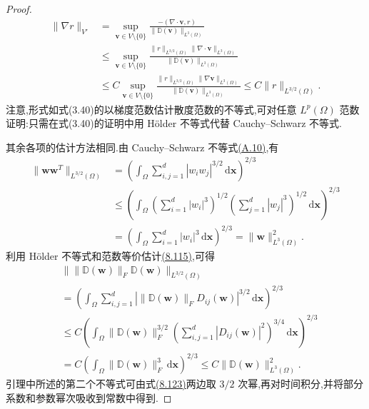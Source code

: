 \begin{lemma}
\begin{proof}
\[
\begin{aligned}
 \|\nabla r\|_{V'}
 &=\sup_{\bm{v}\in V\setminus\{0\}}
       \frac{-(\nabla\cdot\bm{v},r)}
            {\|\mathbb{D}(\bm{v})\|_{L^3(\Omega)}}\\
 &\le \sup_{\bm{v}\in V\setminus\{0\}}
       \frac{\|r\|_{L^{3/2}(\Omega)}
             \|\nabla\cdot\bm{v}\|_{L^3(\Omega)}}
            {\|\mathbb{D}(\bm{v})\|_{L^3(\Omega)}}\\
 &\le C\sup_{\bm{v}\in V\setminus\{0\}}
       \frac{\|r\|_{L^{3/2}(\Omega)}
             \|\nabla\bm{v}\|_{L^3(\Omega)}}
            {\|\mathbb{D}(\bm{v})\|_{L^3(\Omega)}}
 \le C\|r\|_{L^{3/2}(\Omega)}.
\end{aligned}
\]
注意,形式如式(3.40)的以梯度范数估计散度范数的不等式,可对任意 $L^p(\Omega)$ 范数证明:只需在式(3.40)的证明中用 Hölder 不等式代替 Cauchy--Schwarz 不等式.

其余各项的估计方法相同.由 Cauchy--Schwarz 不等式\hyperref[eq:appendix-a-10]{(A.10)},有
\[
\begin{aligned}
 \|\bm{w}\bm{w}^{T}\|_{L^{3/2}(\Omega)}
 &=\left(\int_\Omega\sum_{i,j=1}^d
         |w_iw_j|^{3/2}\,\mathrm{d}\bm{x}\right)^{2/3}\\
 &\le\left(\int_\Omega
       \left(\sum_{i=1}^d|w_i|^3\right)^{1/2}
       \left(\sum_{j=1}^d|w_j|^3\right)^{1/2}
       \,\mathrm{d}\bm{x}\right)^{2/3}\\
 &=\left(\int_\Omega\sum_{i=1}^d|w_i|^3\,\mathrm{d}\bm{x}\right)^{2/3}
   =\|\bm{w}\|_{L^3(\Omega)}^2.
\end{aligned}
\]
利用 Hölder 不等式和范数等价估计\hyperref[eq:smagorinsky-tensor-norm-equivalence]{(8.115)},可得
\[
\begin{aligned}
 &\bigl\|\|\mathbb{D}(\bm{w})\|_F
             \mathbb{D}(\bm{w})\bigr\|_{L^{3/2}(\Omega)}\\
 &=\left(\int_\Omega\sum_{i,j=1}^d
       \left|\|\mathbb{D}(\bm{w})\|_F D_{ij}(\bm{w})\right|^{3/2}
       \,\mathrm{d}\bm{x}\right)^{2/3}\\
 &\le C\left(\int_\Omega\|\mathbb{D}(\bm{w})\|_F^{3/2}
       \left(\sum_{i,j=1}^d|D_{ij}(\bm{w})|^2\right)^{3/4}
       \,\mathrm{d}\bm{x}\right)^{2/3}\\
 &=C\left(\int_\Omega\|\mathbb{D}(\bm{w})\|_F^3
       \,\mathrm{d}\bm{x}\right)^{2/3}
   \le C\|\mathbb{D}(\bm{w})\|_{L^3(\Omega)}^2.
\end{aligned}
\]
引理中所述的第二个不等式可由式\hyperref[eq:smagorinsky-time-derivative-stability]{(8.123)}两边取 $3/2$ 次幂,再对时间积分,并将部分系数和参数幂次吸收到常数中得到.
\end{proof}
\end{lemma}

